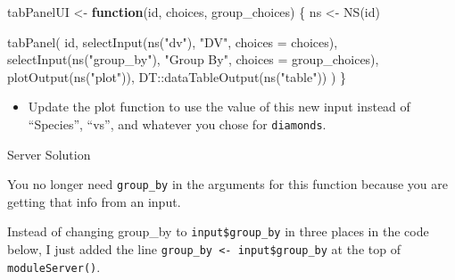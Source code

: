 \documentclass[
  oneside]{book}
\newenvironment{Shaded}{\begin{snugshade}}{\end{snugshade}}
\newcommand{\AttributeTok}[1]{\textcolor[rgb]{0.77,0.63,0.00}{#1}}
\newcommand{\CommentTok}[1]{\textcolor[rgb]{0.56,0.35,0.01}{\textit{#1}}}
\newcommand{\ControlFlowTok}[1]{\textcolor[rgb]{0.13,0.29,0.53}{\textbf{#1}}}
\newcommand{\FunctionTok}[1]{\textcolor[rgb]{0.00,0.00,0.00}{#1}}
\newcommand{\NormalTok}[1]{#1}
\newcommand{\OtherTok}[1]{\textcolor[rgb]{0.56,0.35,0.01}{#1}}
\newcommand{\SpecialCharTok}[1]{\textcolor[rgb]{0.00,0.00,0.00}{#1}}
\newcommand{\StringTok}[1]{\textcolor[rgb]{0.31,0.60,0.02}{#1}}
\providecommand{\tightlist}{%
  \setlength{\itemsep}{0pt}\setlength{\parskip}{0pt}}
\begin{document}
\begin{Shaded}
\begin{Highlighting}[]
\NormalTok{tabPanelUI }\OtherTok{\textless{}{-}} \ControlFlowTok{function}\NormalTok{(id, choices, group\_choices) \{}
\NormalTok{   ns }\OtherTok{\textless{}{-}} \FunctionTok{NS}\NormalTok{(id)}
   
   \FunctionTok{tabPanel}\NormalTok{(}
\NormalTok{       id,}
       \FunctionTok{selectInput}\NormalTok{(}\FunctionTok{ns}\NormalTok{(}\StringTok{"dv"}\NormalTok{), }\StringTok{"DV"}\NormalTok{, }\AttributeTok{choices =}\NormalTok{ choices),}
       \FunctionTok{selectInput}\NormalTok{(}\FunctionTok{ns}\NormalTok{(}\StringTok{"group\_by"}\NormalTok{), }\StringTok{"Group By"}\NormalTok{, }\AttributeTok{choices =}\NormalTok{ group\_choices),}
       \FunctionTok{plotOutput}\NormalTok{(}\FunctionTok{ns}\NormalTok{(}\StringTok{"plot"}\NormalTok{)),}
\NormalTok{       DT}\SpecialCharTok{::}\FunctionTok{dataTableOutput}\NormalTok{(}\FunctionTok{ns}\NormalTok{(}\StringTok{"table"}\NormalTok{))}
\NormalTok{   )}
\NormalTok{\}}
\end{Highlighting}
\end{Shaded}

\begin{itemize}
\tightlist
\item
  Update the plot function to use the value of this new input instead of ``Species'', ``vs'', and whatever you chose for \texttt{diamonds}.
\end{itemize}

Server Solution

You no longer need \texttt{group\_by} in the arguments for this function because you are getting that info from an input.

Instead of changing \AttributeTok{group\_by} to \texttt{input\$group\_by} in three places in the code below, I just added the line \texttt{group\_by\ \textless{}-\ input\$group\_by} at the top of \texttt{moduleServer}\texttt{()}.

\begin{Shaded}
\end{Shaded}
\end{document}
